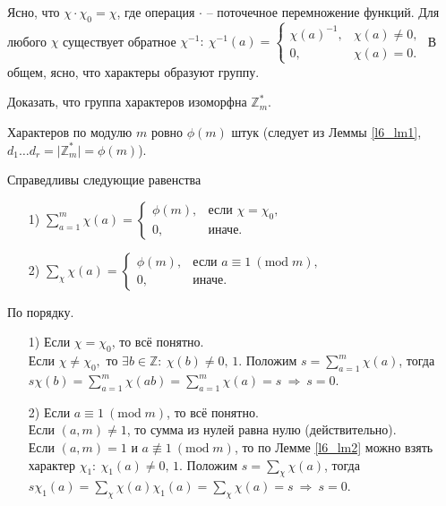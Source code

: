 Ясно, что $\chi \cdot \chi_0 = \chi$, где операция $\cdot$ -- поточечное перемножение функций. Для любого $\chi$ существует обратное $\chi^{-1}: \ \chi^{-1}(a) = \begin{cases} 
	\chi(a)^{-1}, & \chi(a) \ne 0, \\ 
	0, & \chi(a) = 0. 
\end{cases}$ В общем, ясно, что характеры образуют группу.

\begin{problem} \label{l6_task}
	Доказать, что группа характеров изоморфна $\mathbb{Z}_m^\ast$.
\end{problem}

Характеров по модулю $m$ ровно $\phi(m)$ штук (следует из Леммы \ref{l6_lm1}, $d_1 \dots d_r = \lvert \mathbb{Z}_m^\ast \rvert = \phi(m)$).

\begin{lemma} \label{l6_lm3}
	Справедливы следующие равенства
	\begin{enumerate}[nolistsep]
		\item[1)] $\displaystyle \sum\limits_{a=1}^m \chi(a) = 
			\begin{cases} 
				\phi(m), & \text{если } \chi=\chi_0, \\ 
				0, & \text{иначе.} 
			\end{cases}$
		\item[2)] $\displaystyle \sum\limits_\chi \chi(a) = 
		\begin{cases} 
			\phi(m), & \text{если } a \equiv 1 \ (\mathrm{mod} \; m), \\ 
			0, & \text{иначе.} 
		\end{cases}$
	\end{enumerate}
\end{lemma}
\begin{pf}
	По порядку.
	\begin{enumerate}[nolistsep]
		\item[1)] Если $\chi = \chi_0$, то всё понятно.\\
			Если $\chi \ne \chi_0,$ то $\exists b \in \mathbb{Z}: \ \chi(b) \ne 0, \, 1$. Положим $\displaystyle s = \sum\limits_{a=1}^m \chi(a)$, тогда $\displaystyle s \chi(b) = \sum\limits_{a=1}^m \chi(ab) = \sum\limits_{a=1}^m \chi(a) = s \ \Rightarrow \ s = 0$.
		\item[2)] Если $a \equiv 1 \ (\mathrm{mod} \; m)$, то всё понятно.\\
			Если $(a,m) \ne 1$, то сумма из нулей равна нулю (действительно).\\
			Если $(a,m) = 1$ и $a \not\equiv 1 \ (\mathrm{mod} \; m)$, то по Лемме \ref{l6_lm2} можно взять характер $\chi_1: \ \chi_1(a) \ne 0, \, 1.$ 
			Положим $\displaystyle s = \sum\limits_\chi \chi(a)$, тогда $\displaystyle s \chi_1(a) = \sum\limits_\chi \chi(a)\chi_1(a) = \sum\limits_\chi \chi(a) = s \ \Rightarrow \ s = 0$.
	\end{enumerate}
\end{pf}

